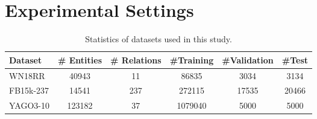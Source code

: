 \documentclass[11pt]{article}
\begin{document}
\section{Experimental Settings}

\begin{table*}[]
\centering
\caption{Statistics of datasets used in this study.}

\begin{tabular}{ l c c c c c  }
 \toprule
 Dataset  & \# Entities & \# Relations & \#{Training}  &  \#{Validation}   & \#{Test}  \\  
 \midrule
WN18RR & 40943   & 11  & 86835  & 3034  & 3134   \\
 FB15k-237 & 14541   & 237  & 272115   & 17535   & 20466\\ YAGO3-10    & 123182    & 37  & 1079040   & 5000   & 5000 \\ 
\bottomrule
\end{tabular} 
\label{Stat}
\end{table*}
\end{document}
